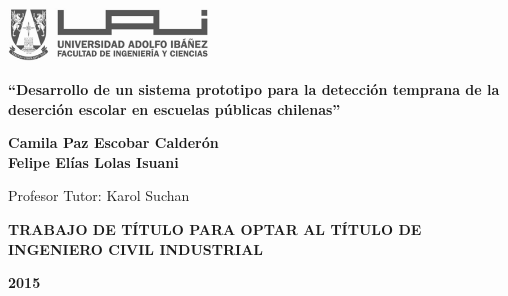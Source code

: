 \begin{titlepage}
\includegraphics[width=0.4\textwidth]{UAI}
    \begin{center}
        \vspace*{5cm}
        
        \textbf{“Desarrollo de un sistema prototipo para la detección temprana de la deserción escolar en escuelas públicas chilenas”}
        
        \vspace{4cm}

        
        \textbf{Camila Paz Escobar Calderón}\\
        \textbf{Felipe Elías Lolas Isuani}\\
        \begin{flushright}
        Profesor Tutor: Karol Suchan
        \end{flushright}
        \vfill
        
        \textbf{TRABAJO DE TÍTULO PARA OPTAR AL TÍTULO DE INGENIERO CIVIL INDUSTRIAL}

        
        \vspace{0.8cm}
        
 
        \textbf{2015}
        
    \end{center}
\end{titlepage}